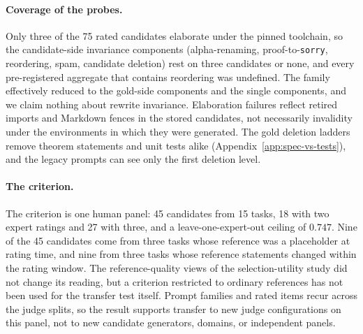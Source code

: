 \paragraph{Coverage of the probes.}\label{sec:limitations-finite}
Only three of the 75 rated candidates elaborate under the pinned toolchain, so the candidate-side invariance components (alpha-renaming, proof-to-\texttt{sorry}, reordering, spam, candidate deletion) rest on three candidates or none, and every pre-registered aggregate that contains reordering was undefined.
The family effectively reduced to the gold-side components and the single components, and we claim nothing about rewrite invariance.
Elaboration failures reflect retired imports and Markdown fences in the stored candidates, not necessarily invalidity under the environments in which they were generated.
The gold deletion ladders remove theorem statements and unit tests alike (Appendix~\ref{app:spec-vs-tests}), and the legacy prompts can see only the first deletion level.

\paragraph{The criterion.}
The criterion is one human panel: 45 candidates from 15 tasks, 18 with two expert ratings and 27 with three, and a leave-one-expert-out ceiling of $0.747$.
Nine of the 45 candidates come from three tasks whose reference was a placeholder at rating time, and nine from three tasks whose reference statements changed within the rating window.
The reference-quality views of the selection-utility study did not change its reading, but a criterion restricted to ordinary references has not been used for the transfer test itself.
Prompt families and rated items recur across the judge splits, so the result supports transfer to new judge configurations on this panel, not to new candidate generators, domains, or independent panels.

